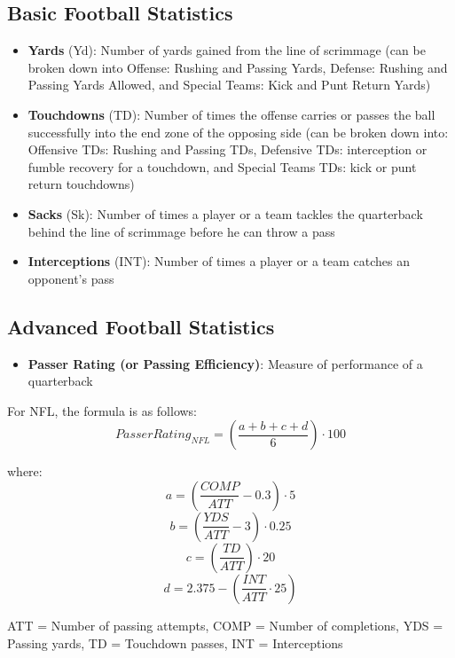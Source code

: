 \documentclass[
  11pt,
]{book}
\providecommand{\tightlist}{%
  \setlength{\itemsep}{0pt}\setlength{\parskip}{0pt}}
\theoremstyle{definition}
\theoremstyle{definition}
\theoremstyle{definition}
\theoremstyle{definition}
\theoremstyle{remark}
\begin{document}
\hypertarget{basic-football-statistics}{%
\subsection{Basic Football Statistics}\label{basic-football-statistics}}

\begin{itemize}
\item
  \textbf{Yards} (Yd): Number of yards gained from the line of scrimmage (can be broken down into Offense: Rushing and Passing Yards, Defense: Rushing and Passing Yards Allowed, and Special Teams: Kick and Punt Return Yards)
\item
  \textbf{Touchdowns} (TD): Number of times the offense carries or passes the ball successfully into the end zone of the opposing side (can be broken down into: Offensive TDs: Rushing and Passing TDs, Defensive TDs: interception or fumble recovery for a touchdown, and Special Teams TDs: kick or punt return touchdowns)
\item
  \textbf{Sacks} (Sk): Number of times a player or a team tackles the quarterback behind the line of scrimmage before he can throw a pass
\item
  \textbf{Interceptions} (INT): Number of times a player or a team catches an opponent's pass
\end{itemize}

\hypertarget{advanced-football-statistics}{%
\subsection{Advanced Football Statistics}\label{advanced-football-statistics}}

\begin{itemize}
\tightlist
\item
  \textbf{Passer Rating (or Passing Efficiency)}: Measure of performance of a quarterback
\end{itemize}

For NFL, the formula is as follows:\\

\[Passer Rating_{NFL} = \left(\frac{a+b+c+d}{6}\right) \cdot 100\]

where:
\[a = \left(\frac{COMP}{ATT}-0.3\right) \cdot 5\]
\[b = \left(\frac{YDS}{ATT} - 3\right) \cdot 0.25\]
\[c = \left(\frac{TD}{ATT}\right) \cdot 20\]
\[d = 2.375 - \left(\frac{INT}{ATT} \cdot 25\right)\]

ATT = Number of passing attempts, COMP = Number of completions, YDS = Passing yards, TD = Touchdown passes, INT = Interceptions\\
\end{document}
